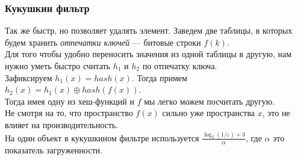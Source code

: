 \subsubsection{Кукушкин фильтр}
Так же быстр, но позволяет удалять элемент.
Заведем две таблицы, в которых будем хранить \textit{отпечатки ключей} --- битовые строки $f(k)$. \\
Для того чтобы удобно переносить значения из одной таблицы в другую, нам нужно уметь быстро считать $h_1$ и $h_2$ по отпечатку ключа. \\
Зафиксируем $h_1(x) = hash(x)$. Тогда примем $h_2(x) = h_1(x) \oplus hash(f(x))$. \\
Тогда имея одну из хеш-функций и $f$ мы легко можем посчитать другую. \\

Не смотря на то, что пространство $f(x)$ сильно уже пространства $x$, это не влияет на производительность. \\
На один объект в кукушкином фильтре используется $\frac{\log_2(1/\varepsilon) + 3}{\alpha}$, где $\alpha$ это показатель загруженности.


 
